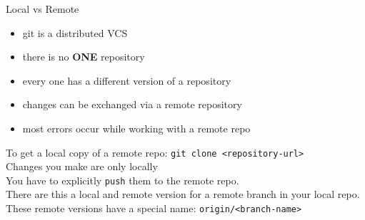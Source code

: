 \begin{frame}[allowframebreaks]{Local vs Remote}
	\begin{itemize}
		\item git is a distributed VCS
		\item there is no \textbf{ONE} repository
		\item every one has a different version of a repository
		\item changes can be exchanged via a remote repository
		\item most errors occur while working with a remote repo
	\end{itemize}

	
	

	\framebreak
	
	
	To get a local copy of a remote repo: \texttt{git clone <repository-url>}\\
	\vspace{.5cm}
	Changes you make are only locally\\
	\vspace{.5cm}
	You have to explicitly \texttt{push} them to the remote repo.\\
	\vspace{.5cm}
	There are this a local and remote version for a remote branch in your local repo.\\
	\vspace{.5cm} 
	These remote versions have a special name: \texttt{origin/<branch-name>}
	
	
\end{frame}
